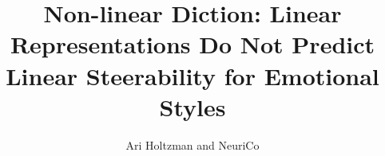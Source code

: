 \documentclass{article}
\title{Non-linear Diction: Linear Representations Do Not Predict Linear Steerability for Emotional Styles}
\author{Ari Holtzman and NeuriCo}
\begin{document}
\maketitle

\begin{abstract}

\end{abstract}










\end{document}
